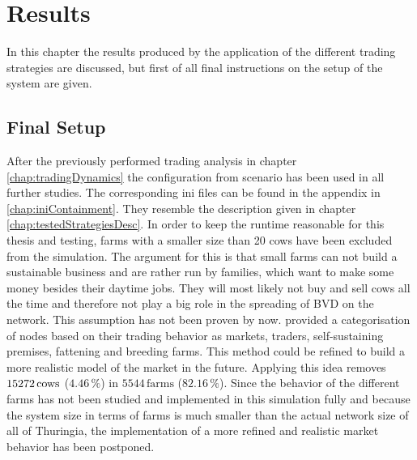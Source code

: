\chapter{Results}
In this chapter the results produced by the application of the different trading strategies are discussed, but first of all final instructions on the setup of the system are given.
\section{Final Setup}
After the previously performed trading analysis in chapter \ref{chap:tradingDynamics} the configuration from scenario has been used in all further studies. The corresponding ini files can be found in the appendix in \ref{chap:iniContainment}. They resemble the description given in chapter \ref{chap:testedStrategiesDesc}.  
In order to keep the runtime reasonable for this thesis and testing, farms with a smaller size than 20 cows have been excluded from the simulation. The argument for this is that small farms can not build a sustainable business and are rather run by families, which want to make some money besides their daytime jobs. They will most likely not buy and sell cows all the time and therefore not play a big role in the spreading of BVD on the network. This assumption has not been proven by now. \citep{steinbach16} provided a categorisation of nodes based on their trading behavior as markets, traders, self-sustaining premises, fattening and breeding farms. This method could be refined to build a more realistic model of the market in the future. 
Applying this idea removes $15272\,\text{cows}$ ($4.46\,\%$) in $5544\,\text{farms}$ ($82.16\,\%$).
Since the behavior of the different farms has not been studied and implemented in this simulation fully and because the system size in terms of farms is much smaller than the actual network size of all of Thuringia, the implementation of a more refined and realistic market behavior has been postponed. 
